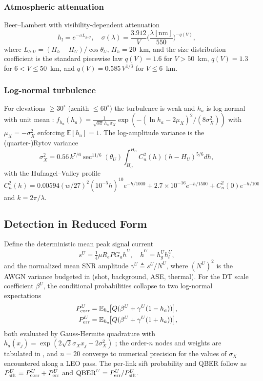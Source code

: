 \subsubsection{Atmospheric attenuation}
Beer--Lambert with visibility-dependent attenuation
\begin{equation}
  h_l = e^{-\sigma L_{h\text{-}U}},\quad \sigma(\lambda) = \frac{3.912}{V}\Big(\frac{\lambda[\mathrm{nm}]}{550}\Big)^{-q(V)},
\end{equation}
where $L_{h\text{-}U} = (H_h - H_U)/\cos\theta_U$, $H_h{=}20$~km, and the size-distribution coefficient is the standard piecewise law $q(V) = 1.6$ for $V > 50$~km, $q(V) = 1.3$ for $6 < V \le 50$~km, and $q(V) = 0.585\,V^{1/3}$ for $V \le 6$~km.

\subsubsection{Log-normal turbulence}
For elevations $\ge 30^\circ$ (zenith $\le 60^\circ$) the turbulence is weak and $h_a$ is log-normal with unit mean \cite{andrews2005laser,vetelino2007fade}: $f_{h_a}(h_a) = \tfrac{1}{\sqrt{8\pi}\,h_a\,\sigma_X}\exp(-(\ln h_a - 2\mu_X)^2/(8\sigma_X^2))$ with $\mu_X = -\sigma_X^2$ enforcing $\mathbb{E}[h_a] = 1$. The log-amplitude variance is the (quarter-)Rytov variance
\begin{equation}
  \sigma_X^2 = 0.56\,k^{7/6}\sec^{11/6}(\theta_U)\int_{H_U}^{H_C} C_n^2(h)(h-H_U)^{5/6}dh,
\end{equation}
with the Hufnagel--Valley profile $C_n^2(h) = 0.00594(w/27)^2(10^{-5}h)^{10}e^{-h/1000} + 2.7\times10^{-16}e^{-h/1500} + C_n^2(0)e^{-h/100}$ and $k = 2\pi/\lambda$.

\subsection{Detection in Reduced Form}\label{sec:system:detection}

Define the deterministic mean peak signal current
\begin{equation}
  s^U = \tfrac14 \mu R_e P G_a \bar h^U,\quad \bar h^U = h_g^U h_l^U,
\end{equation}
and the normalized mean SNR amplitude $\gamma^U \triangleq s^U/N^U$, where $(N^U)^2$ is the AWGN variance budgeted in \cite[Eq.~4]{vu2023photonics} (shot, background, ASE, thermal). For the DT scale coefficient $\beta^U$, the conditional probabilities collapse to two log-normal expectations
\begin{align}
  P_{\mathrm{corr}}^U &= \mathbb{E}_{h_a}\!\big[ Q(\beta^U + \gamma^U(1-h_a))\big], \label{eq:pc}\\
  P_{\mathrm{err}}^U &= \mathbb{E}_{h_a}\!\big[ Q(\beta^U + \gamma^U(1+h_a))\big], \label{eq:pe}
\end{align}
both evaluated by Gauss-Hermite quadrature with $h_a(x_j) = \exp(2\sqrt2\sigma_X x_j - 2\sigma_X^2)$ \cite[Eq.~30]{vu2023photonics}; the order-$n$ nodes and weights are tabulated in \cite[Tbl.~25.10]{abramowitz1965handbook}, and $n{=}20$ converge to numerical precision for the values of $\sigma_X$ encountered along a LEO pass. The per-link sift probability and QBER follow as $P_{\mathrm{sift}}^U = P_{\mathrm{corr}}^U + P_{\mathrm{err}}^U$ and $\mathrm{QBER}^U = P_{\mathrm{err}}^U/P_{\mathrm{sift}}^U$.

